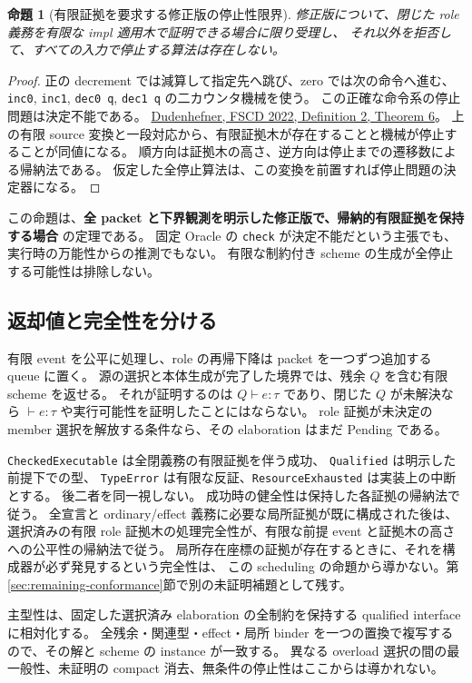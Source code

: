 \documentclass[11pt,a4paper]{article}
\newtheorem{theorem}{命題}[section]
\theoremstyle{remark}
\begin{document}
\begin{theorem}[有限証拠を要求する修正版の停止性限界]
修正版について、閉じた role 義務を有限な impl 適用木で証明できる場合に限り受理し、
それ以外を拒否して、すべての入力で停止する算法は存在しない。
\end{theorem}
\begin{proof}
正の decrement では減算して指定先へ跳び、zero では次の命令へ進む、
\texttt{inc0}, \texttt{inc1}, \texttt{dec0 q}, \texttt{dec1 q} の二カウンタ機械を使う。
この正確な命令系の停止問題は決定不能である。
\href{https://doi.org/10.4230/LIPIcs.FSCD.2022.16}{Dudenhefner, FSCD 2022, Definition 2, Theorem 6}。
上の有限 source 変換と一段対応から、有限証拠木が存在することと機械が停止することが同値になる。
順方向は証拠木の高さ、逆方向は停止までの遷移数による帰納法である。
仮定した全停止算法は、この変換を前置すれば停止問題の決定器になる。
\end{proof}

この命題は、\textbf{全 packet と下界観測を明示した修正版で、帰納的有限証拠を保持する場合}
の定理である。
固定 Oracle の \texttt{check} が決定不能だという主張でも、実行時の万能性からの推測でもない。
有限な制約付き scheme の生成が全停止する可能性は排除しない。

\subsection{返却値と完全性を分ける}

有限 event を公平に処理し、role の再帰下降は packet を一つずつ追加する queue に置く。
源の選択と本体生成が完了した境界では、残余 $Q$ を含む有限 scheme を返せる。
それが証明するのは $Q\vdash e:\tau$ であり、閉じた $Q$ が未解決なら
$\vdash e:\tau$ や実行可能性を証明したことにはならない。
role 証拠が未決定の member 選択を解放する条件なら、その elaboration はまだ Pending である。

\texttt{CheckedExecutable} は全閉義務の有限証拠を伴う成功、
\texttt{Qualified} は明示した前提下での型、
\texttt{TypeError} は有限な反証、\texttt{ResourceExhausted} は実装上の中断とする。
後二者を同一視しない。
成功時の健全性は保持した各証拠の帰納法で従う。
全宣言と ordinary/effect 義務に必要な局所証拠が既に構成された後は、
選択済みの有限 role 証拠木の処理完全性が、有限な前提 event と証拠木の高さへの公平性の帰納法で従う。
局所存在座標の証拠が存在するときに、それを構成器が必ず発見するという完全性は、
この scheduling の命題から導かない。第\ref{sec:remaining-conformance}節で別の未証明補題として残す。

主型性は、固定した選択済み elaboration の全制約を保持する qualified interface に相対化する。
全残余・関連型・effect・局所 binder を一つの置換で複写するので、その解と scheme の instance が一致する。
異なる overload 選択の間の最一般性、未証明の compact 消去、無条件の停止性はここからは導かれない。
\end{document}
